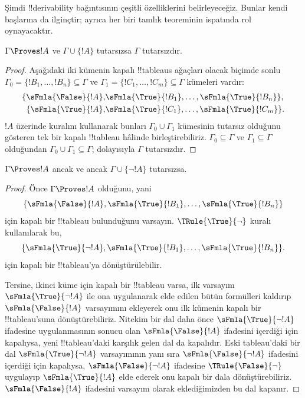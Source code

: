 \documentclass[../../../include/open-logic-section]{subfiles}
\begin{document}
      {}
      {}


Şimdi !!{derivability} bağıntısının çeşitli özelliklerini belirleyeceğiz.
Bunlar kendi başlarına da ilginçtir; ayrıca her biri tamlık teoreminin
ispatında rol oynayacaktır.

\begin{prop}
  $\Gamma \Proves !A$ ve $\Gamma \cup \{!A\}$ tutarsızsa $\Gamma$
  tutarsızdır.
\end{prop}

\begin{proof}
Aşağıdaki iki kümenin kapalı !!{tableau}s ağaçları olacak biçimde sonlu
$\Gamma_0 = \{!B_1, \dots, !B_n\} \subseteq \Gamma$ ve
$\Gamma_1 =\{!C_1, \dots, !C_m\} \subseteq \Gamma$ kümeleri vardır:
  \begin{align*}
    \{\sFmla{\False}{!A}, &
    \sFmla{\True}{!B_1}, \dots, \sFmla{\True}{!B_n}\}, \\
    \{\sFmla{\True}{!A}, &
    \sFmla{\True}{!C_1}, \dots, \sFmla{\True}{!C_m}\}.
  \end{align*}
  $!A$ üzerinde \Cut{} kuralını kullanarak bunları $\Gamma_0
  \cup \Gamma_1$ kümesinin tutarsız olduğunu gösteren tek bir kapalı
  !!{tableau} hâlinde birleştirebiliriz. $\Gamma_0 \subseteq \Gamma$ ve
  $\Gamma_1 \subseteq \Gamma$ olduğundan $\Gamma_0 \cup
  \Gamma_1 \subseteq \Gamma$; dolayısıyla $\Gamma$ tutarsızdır.
\end{proof}

\begin{prop}
$\Gamma \Proves !A$ ancak ve ancak $\Gamma \cup \{\lnot !A\}$ tutarsızsa.
\end{prop}

\begin{proof}
Önce $\Gamma \Proves !A$ olduğunu, yani
\[
\{\sFmla{\False}{!A},
\sFmla{\True}{!B_1}, \dots, \sFmla{\True}{!B_n}\}
\]
için kapalı bir !!{tableau} bulunduğunu varsayın. $\TRule{\True}{\lnot}$
kuralı kullanılarak bu,
\[
\{\sFmla{\True}{\lnot !A},
\sFmla{\True}{!B_1}, \dots, \sFmla{\True}{!B_n}\}.
\]
için kapalı bir !!{tableau}'ya dönüştürülebilir.

Tersine, ikinci küme için kapalı bir !!{tableau} varsa, ilk
varsayım~$\sFmla{\True}{\lnot !A}$ ile ona
\TRule{\True}{\lnot} uygulanarak elde edilen bütün formülleri kaldırıp
$\sFmla{\False}{!A}$ varsayımını ekleyerek onu ilk kümenin kapalı bir
!!{tableau}'suna dönüştürebiliriz. Nitekim bir dal daha önce
$\sFmla{\True}{\lnot !A}$ ifadesine \TRule{\True}{\lnot} uygulanmasının
sonucu olan $\sFmla{\False}{!A}$ ifadesini içerdiği için kapalıysa, yeni
!!{tableau}'daki karşılık gelen dal da kapalıdır. Eski tableau'daki bir dal
$\sFmla{\True}{\lnot !A}$ varsayımının yanı sıra
$\sFmla{\False}{\lnot !A}$ ifadesini içerdiği için kapalıysa,
$\sFmla{\False}{\lnot !A}$ ifadesine $\TRule{\False}{\lnot}$ uygulayıp
$\sFmla{\True}{!A}$ elde ederek onu kapalı bir dala dönüştürebiliriz.
$\sFmla{\False}{!A}$ ifadesini varsayım olarak eklediğimizden bu dal
kapanır.
\end{proof}
\end{document}
